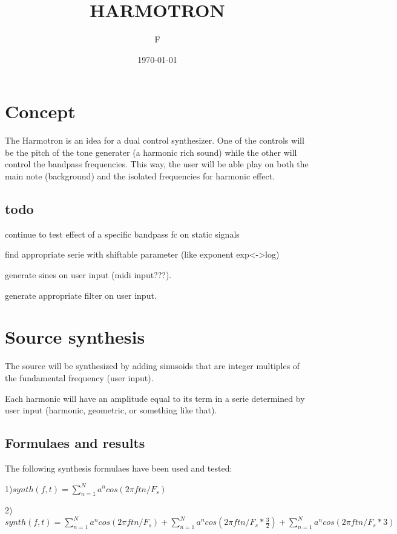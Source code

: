 \documentclass{article}
\title{HARMOTRON}
\author{F}
\date{\today}
\begin{document}
\section{Concept}
The Harmotron is an idea for a dual control synthesizer. One of the controls
will be the pitch of the tone generater (a harmonic rich sound) while the other
will control the bandpass frequencies. This way, the user will be able play
on both the main note (background) and the isolated frequencies for harmonic
effect.

\subsection{todo}
\begin{description}
\item continue to test effect of a specific bandpass fc on static signals
\item find appropriate serie with shiftable parameter (like exponent exp<->log)
\item generate sines on user input (midi input???). 
\item generate appropriate filter on user input.
\end{description}


\section{Source synthesis}
The source will be synthesized by adding sinusoids that are integer multiples of
the fundamental frequency (user input). 

Each harmonic will have an amplitude equal to its term in a serie determined
by user input (harmonic, geometric, or something like that).

\subsection{Formulaes and results}
The following synthesis formulaes have been used and tested:
\begin{description}
\item 1)$synth(f, t) = \sum\limits_{n=1}^N a^n cos(2 \pi f t n /F_s)$
\item 2)$synth(f, t) = \sum\limits_{n=1}^N a^n cos(2 \pi f t n /F_s)
                     + \sum\limits_{n=1}^N a^n cos(2 \pi f t n /F_s * \frac{3}{2})
                     + \sum\limits_{n=1}^N a^n cos(2 \pi f t n /F_s * 3)$
\end{description}
\end{document}
